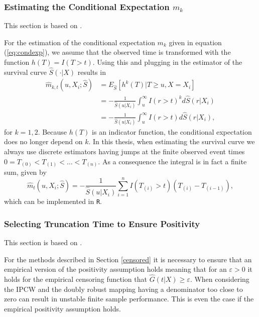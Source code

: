 \documentclass[12pt, a4paper]{scrartcl}
\theoremstyle{definition}
\theoremstyle{plain}
\numberwithin{equation}{section}
\numberwithin{figure}{section}
\numberwithin{table}{section}
\begin{document}
	\subsubsection{Estimating the Conditional Expectation $m_k$}
	
	This section is based on \citet*{drtrees}.
	
	For the estimation of the conditional expectation $m_k$ given in equation (\ref{eq:condexp}), we assume that the observed time is transformed with the function $h(T) = I(T>t)$.
	Using this and plugging in the estimator of the survival curve $\hat{S}(\cdot\vert X)$ results in
	\begin{equation*}
	\begin{split}
	\hat{m}_{k,t} (u, X_i; \hat{S}) &= E_{\hat{S}}[h^k(T)\vert T \geq u, X=X_i]\\
	&=-\frac{1}{\hat{S}(u\vert X_i)}\int_u^{\infty}I(r> t)^kd\hat{S}(r\vert X_i)\\
	&=-\frac{1}{\hat{S}(u\vert X_i)}\int_u^{\infty}I(r> t)d\hat{S}(r\vert X_i),
	\end{split}
	\end{equation*}
	for $k=1,2$.
	Because $h(T)$ is an indicator function, the conditional expectation does no longer depend on $k$.
	In this thesis, when estimating the survival curve we always use discrete estimators having jumps at the finite observed event times $0=T_{(0)}<T_{(1)}<\dots<T_{(n)}$.
	As a consequence the integral is in fact a finite sum, given by
	\begin{equation*}
	\hat{m}_t (u, X_i; \hat{S}) = -\frac{1}{\hat{S}(u\vert X_i)}\sum_{i=1}^n I(T_{(i)}>t)(T_{(i)}-T_{(i-1)}),
	\end{equation*}
	which can be implemented in \texttt{R}.
	
	\subsubsection{Selecting Truncation Time to Ensure Positivity}
	
	This section is based on \citet*{drtrees}.
	
	For the methods described in Section \ref{censored} it is necessary to ensure that an empirical version of the positivity assumption holds meaning that for an $\varepsilon>0$ it holds for the empirical censoring function that $\hat{G}(t\vert X) \geq \varepsilon$.
	When considering the IPCW and the doubly robust mapping having a denominator too close to zero can result in unstable finite sample performance.
	This is even the case if the empirical positivity assumption holds.
	
\end{document}
